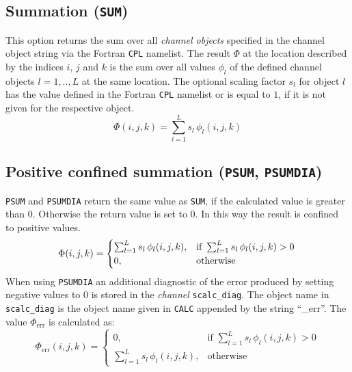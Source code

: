 \documentclass[twoside]{article}
\begin{document}
\subsection{Summation ({\tt SUM})}
\label{sec:summation}
%
This option returns the sum over all {\it channel objects} specified in the channel object string via the Fortran {\tt CPL} namelist.
The result $\Phi$ at the location described by the indices $i$, $j$ and $k$ is the sum over all values $\phi_l$ of the defined channel objects $l=1,..,L$ at the same location.
The optional scaling factor $s_l$ for object $l$ has the value defined in the Fortran {\tt CPL} namelist or is equal to $1$, if it is not given for the respective object.
%
\begin{equation}
\Phi(i,j,k) = \sum_{l=1}^Ls_l\,\phi_l(i,j,k)
\end{equation}
%
\subsection{Positive confined summation ({\tt PSUM}, {\tt PSUMDIA})}
\label{sec:positive_summation}
%
{\tt PSUM} and {\tt PSUMDIA} return the same value as {\tt SUM}, if the calculated value is greater than $0$.
Otherwise the return value is set to 0.
In this way the result is confined to positive values.
%
\begin{equation}
\Phi(i,j,k) =
\begin{cases}
  \sum_{l=1}^Ls_l\,\phi_l(i,j,k), &\text{if } \sum_{l=1}^Ls_l\,\phi_l(i,j,k) > 0\\
  0,                             &\text{otherwise}
\end{cases}\\
\end{equation}
%
When using {\tt PSUMDIA} an additional diagnostic of the error produced by setting negative values to $0$ is stored in the {\it channel} {\tt scalc\_diag}.
The object name in {\tt scalc\_diag} is the object name given in {\tt CALC} appended by the string ``\_err''.
The value $\Phi_{\text{err}}$ is calculated as:
%
\begin{equation}
\Phi_{\text{err}}(i,j,k) =
\begin{cases}
  0,                                    &\text{if } \sum_{l=1}^Ls_l\,\phi_l(i,j,k) > 0\\
  \sum_{l=1}^Ls_l\,\phi_l(i,j,k), &\text{otherwise}
\end{cases}
\end{equation}
%
\end{document}
